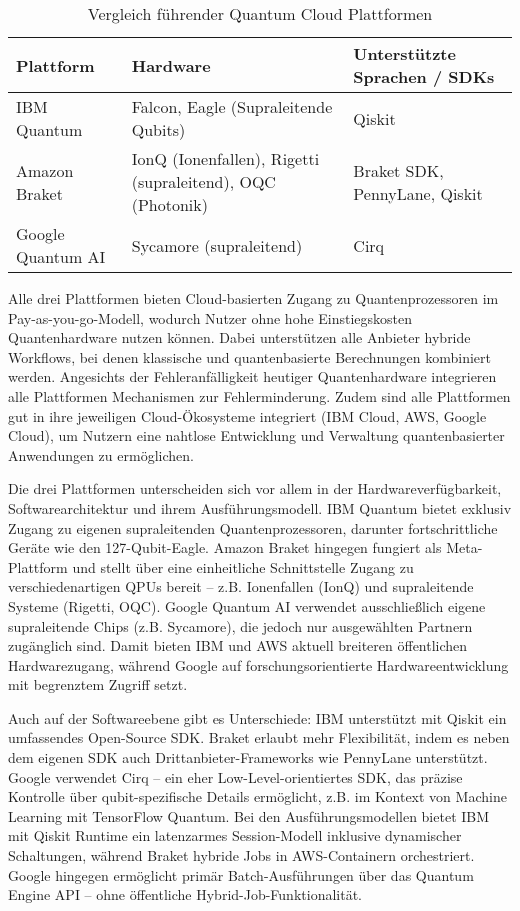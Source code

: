 \begin{table}[ht!]
\centering
\begin{tabular}{|p{2.5cm}|p{4.8cm}|p{4cm}|}
\hline
\textbf{Plattform} & \textbf{Hardware} & \textbf{Unterstützte Sprachen / SDKs} \\
\hline
IBM Quantum & Falcon, Eagle (Supraleitende Qubits) & Qiskit \\
\hline
Amazon Braket & IonQ (Ionenfallen), Rigetti (supraleitend), OQC (Photonik) & Braket SDK, PennyLane, Qiskit \\
\hline
Google Quantum AI & Sycamore (supraleitend) & Cirq \\
\hline
\end{tabular}
\caption{Vergleich führender Quantum Cloud Plattformen}
\label{tab:quantum-cloud-platforms}
\end{table}

Alle drei Plattformen bieten Cloud-basierten Zugang zu Quantenprozessoren im Pay-as-you-go-Modell, wodurch Nutzer ohne hohe Einstiegskosten Quantenhardware nutzen können. Dabei unterstützen alle Anbieter hybride Workflows, bei denen klassische und quantenbasierte Berechnungen kombiniert werden. Angesichts der Fehleranfälligkeit heutiger Quantenhardware integrieren alle Plattformen Mechanismen zur Fehlerminderung. Zudem sind alle Plattformen gut in ihre jeweiligen Cloud-Ökosysteme integriert (IBM Cloud, AWS, Google Cloud), um Nutzern eine nahtlose Entwicklung und Verwaltung quantenbasierter Anwendungen zu ermöglichen.

Die drei Plattformen unterscheiden sich vor allem in der Hardwareverfügbarkeit, Softwarearchitektur und ihrem Ausführungsmodell. IBM Quantum bietet exklusiv Zugang zu eigenen supraleitenden Quantenprozessoren, darunter fortschrittliche Geräte wie den 127-Qubit-Eagle. Amazon Braket hingegen fungiert als Meta-Plattform und stellt über eine einheitliche Schnittstelle Zugang zu verschiedenartigen QPUs bereit – z.B. Ionenfallen (IonQ) und supraleitende Systeme (Rigetti, OQC). Google Quantum AI verwendet ausschließlich eigene supraleitende Chips (z.B. Sycamore), die jedoch nur ausgewählten Partnern zugänglich sind. Damit bieten IBM und AWS aktuell breiteren öffentlichen Hardwarezugang, während Google auf forschungsorientierte Hardwareentwicklung mit begrenztem Zugriff setzt.

Auch auf der Softwareebene gibt es Unterschiede: IBM unterstützt mit Qiskit ein umfassendes Open-Source SDK. Braket erlaubt mehr Flexibilität, indem es neben dem eigenen SDK auch Drittanbieter-Frameworks wie PennyLane unterstützt. Google verwendet Cirq – ein eher Low-Level-orientiertes SDK, das präzise Kontrolle über qubit-spezifische Details ermöglicht, z.B. im Kontext von Machine Learning mit TensorFlow Quantum. Bei den Ausführungsmodellen bietet IBM mit Qiskit Runtime ein latenzarmes Session-Modell inklusive dynamischer Schaltungen, während Braket hybride Jobs in AWS-Containern orchestriert. Google hingegen ermöglicht primär Batch-Ausführungen über das Quantum Engine API – ohne öffentliche Hybrid-Job-Funktionalität. \autocite{googleGoogleQuantumComputing2025} \autocite{mittalQiskitRuntimeCloudNative2022} \autocite{amazonwebservicesAmazonBraketFeatures2025}

